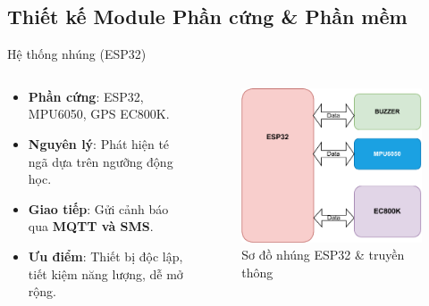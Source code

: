 \subsection{Thiết kế Module Phần cứng & Phần mềm}
\begin{frame}{Hệ thống nhúng (ESP32)}
    \begin{columns}[T]
        \begin{column}{0.48\textwidth}
            \begin{itemize}
                \item \textbf{Phần cứng}: ESP32, MPU6050, GPS EC800K.
                \item \textbf{Nguyên lý}: Phát hiện té ngã dựa trên ngưỡng động học.
                \item \textbf{Giao tiếp}: Gửi cảnh báo qua \textbf{MQTT và SMS}.
                \item \textbf{Ưu điểm}: Thiết bị độc lập, tiết kiệm năng lượng, dễ mở rộng.
            \end{itemize}
        \end{column}
        \begin{column}{0.48\textwidth}
            \begin{figure}
                \centering
                \includegraphics[width=\textwidth]{images/module1_block_diagram-crop.pdf}
                \caption{Sơ đồ nhúng ESP32 \& truyền thông}
            \end{figure}
        \end{column}
    \end{columns}
\end{frame}

